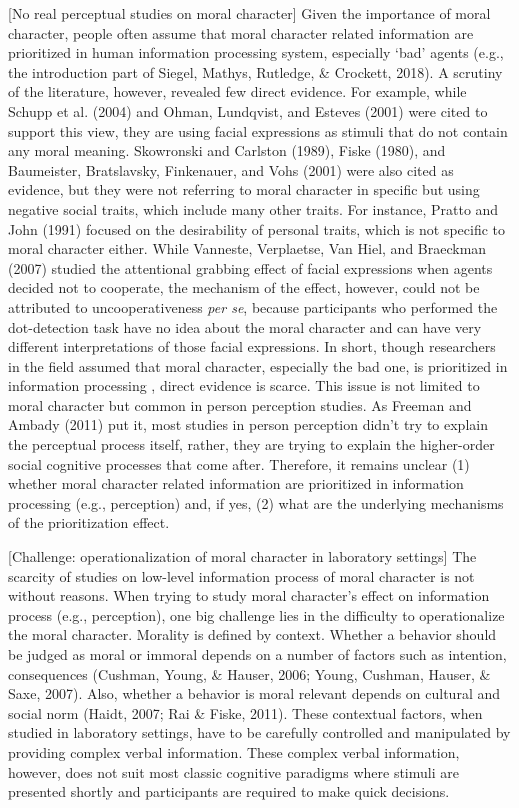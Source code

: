 \documentclass[
  english,
  man]{apa6}
\begin{document}
{[}No real perceptual studies on moral character{]}
Given the importance of moral character, people often assume that moral character related information are prioritized in human information processing system, especially `bad' agents (e.g., the introduction part of Siegel, Mathys, Rutledge, \& Crockett, 2018). A scrutiny of the literature, however, revealed few direct evidence. For example, while Schupp et al. (2004) and Ohman, Lundqvist, and Esteves (2001) were cited to support this view, they are using facial expressions as stimuli that do not contain any moral meaning. Skowronski and Carlston (1989), Fiske (1980), and Baumeister, Bratslavsky, Finkenauer, and Vohs (2001) were also cited as evidence, but they were not referring to moral character in specific but using negative social traits, which include many other traits. For instance, Pratto and John (1991) focused on the desirability of personal traits, which is not specific to moral character either. While Vanneste, Verplaetse, Van Hiel, and Braeckman (2007) studied the attentional grabbing effect of facial expressions when agents decided not to cooperate, the mechanism of the effect, however, could not be attributed to uncooperativeness \emph{per se}, because participants who performed the dot-detection task have no idea about the moral character and can have very different interpretations of those facial expressions. In short, though researchers in the field assumed that moral character, especially the bad one, is prioritized in information processing , direct evidence is scarce. This issue is not limited to moral character but common in person perception studies. As Freeman and Ambady (2011) put it, most studies in person perception didn't try to explain the perceptual process itself, rather, they are trying to explain the higher-order social cognitive processes that come after. Therefore, it remains unclear (1) whether moral character related information are prioritized in information processing (e.g., perception) and, if yes, (2) what are the underlying mechanisms of the prioritization effect.

{[}Challenge: operationalization of moral character in laboratory settings{]}
The scarcity of studies on low-level information process of moral character is not without reasons. When trying to study moral character's effect on information process (e.g., perception), one big challenge lies in the difficulty to operationalize the moral character. Morality is defined by context. Whether a behavior should be judged as moral or immoral depends on a number of factors such as intention, consequences (Cushman, Young, \& Hauser, 2006; Young, Cushman, Hauser, \& Saxe, 2007). Also, whether a behavior is moral relevant depends on cultural and social norm (Haidt, 2007; Rai \& Fiske, 2011). These contextual factors, when studied in laboratory settings, have to be carefully controlled and manipulated by providing complex verbal information. These complex verbal information, however, does not suit most classic cognitive paradigms where stimuli are presented shortly and participants are required to make quick decisions.
\end{document}
